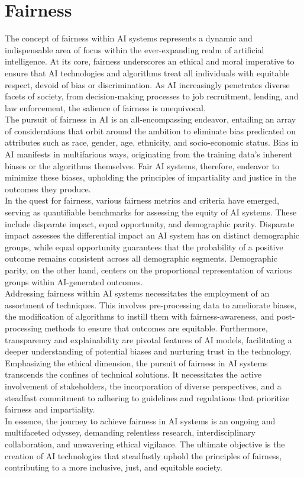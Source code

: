 \documentclass[12pt,a4paper,openright,twoside]{book}
\begin{document}
\section{Fairness} 
The concept of fairness within AI systems represents a dynamic and indispensable area of focus within the ever-expanding realm of artificial intelligence. At its core, fairness underscores an ethical and moral imperative to ensure that AI technologies and algorithms treat all individuals with equitable respect, devoid of bias or discrimination. As AI increasingly penetrates diverse facets of society, from decision-making processes to job recruitment, lending, and law enforcement, the salience of fairness is unequivocal.\\
The pursuit of fairness in AI is an all-encompassing endeavor, entailing an array of considerations that orbit around the ambition to eliminate bias predicated on attributes such as race, gender, age, ethnicity, and socio-economic status. Bias in AI manifests in multifarious ways, originating from the training data's inherent biases or the algorithms themselves. Fair AI systems, therefore, endeavor to minimize these biases, upholding the principles of impartiality and justice in the outcomes they produce.\\
In the quest for fairness, various fairness metrics and criteria have emerged, serving as quantifiable benchmarks for assessing the equity of AI systems. These include disparate impact, equal opportunity, and demographic parity. Disparate impact assesses the differential impact an AI system has on distinct demographic groups, while equal opportunity guarantees that the probability of a positive outcome remains consistent across all demographic segments. Demographic parity, on the other hand, centers on the proportional representation of various groups within AI-generated outcomes. \\
Addressing fairness within AI systems necessitates the employment of an assortment of techniques. This involves pre-processing data to ameliorate biases, the modification of algorithms to instill them with fairness-awareness, and post-processing methods to ensure that outcomes are equitable. Furthermore, transparency and explainability are pivotal features of AI models, facilitating a deeper understanding of potential biases and nurturing trust in the technology. \\
Emphasizing the ethical dimension, the pursuit of fairness in AI systems transcends the confines of technical solutions. It necessitates the active involvement of stakeholders, the incorporation of diverse perspectives, and a steadfast commitment to adhering to guidelines and regulations that prioritize fairness and impartiality. \cite{10.1145/3457607}  \cite{10.1145/3194770.3194776}\\
In essence, the journey to achieve fairness in AI systems is an ongoing and multifaceted odyssey, demanding relentless research, interdisciplinary collaboration, and unwavering ethical vigilance. The ultimate objective is the creation of AI technologies that steadfastly uphold the principles of fairness, contributing to a more inclusive, just, and equitable society.
\end{document}
